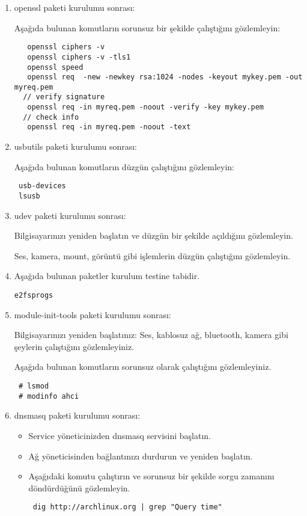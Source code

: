 \documentclass[a4paper,10pt]{article}
\begin{document}
\begin{enumerate}
\item openssl paketi kurulumu sonrası:

Aşağıda bulunan komutların sorunsuz bir şekilde çalıştığını gözlemleyin:
\begin{verbatim}
   openssl ciphers -v 
   openssl ciphers -v -tls1
   openssl speed
   openssl req  -new -newkey rsa:1024 -nodes -keyout mykey.pem -out myreq.pem
  // verify signature
   openssl req -in myreq.pem -noout -verify -key mykey.pem
  // check info
   openssl req -in myreq.pem -noout -text

\end{verbatim}


\item usbutils paketi kurulumu sonrası:

Aşağıda bulunan komutların düzgün çalıştığını gözlemleyin:
\begin{verbatim}
 usb-devices
 lsusb
\end{verbatim}


\item udev paketi kurulumu sonrası:

Bilgisayarınızı yeniden başlatın ve düzgün bir şekilde açıldığını gözlemleyin. 

Ses, kamera, mount, görüntü gibi işlemlerin düzgün çalıştığını gözlemleyin.
\item Aşağıda bulunan paketler kurulum testine tabidir.
\begin{verbatim}
e2fsprogs 
\end{verbatim}
\item module-init-tools paketi kurulumu sonrası:

Bilgisayarınızı yeniden başlatınız:
Ses, kablosuz ağ, bluetooth, kamera gibi şeylerin çalıştığını gözlemleyiniz.

Aşağıda bulunan komutların sorunsuz olarak çalıştığını gözlemleyiniz.
\begin{verbatim}
 # lsmod
 # modinfo ahci
\end{verbatim}


\item dnsmasq paketi kurulumu sonrası:

\begin{itemize}
 \item Service yöneticinizden dnsmasq servisini başlatın.
 \item Ağ yöneticisinden bağlantınızı durdurun ve yeniden başlatın.
 \item Aşağıdaki komutu çalıştırın ve sorunsuz bir şekilde sorgu zamanını döndürdüğünü gözlemleyin.
\begin{verbatim}
 dig http://archlinux.org | grep "Query time"
\end{verbatim}


\end{itemize}
\end{enumerate}
\end{document}
